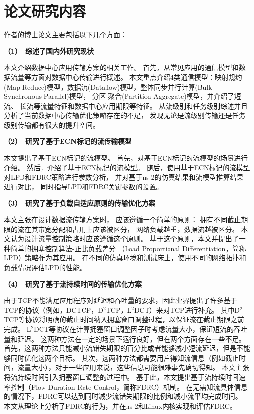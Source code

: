 \section{论文研究内容}
作者的博士论文主要包括以下几个方面：

\textbf{（1）~综述了国内外研究现状}

本文介绍数据中心应用传输方案的相关工作。
首先，从常见应用的通信模型和数据流量等方面对数据中心传输进行概述。
本文重点介绍4类通信模型：映射规约(Map-Reduce)模型，数据流(Dataflow)模型，整体同步并行计算(Bulk Synchronous Parallel)模型，
分区-聚合(Partition-Aggregate)模型，并介绍了短流、
长流等流量特征和数据中心应用期限等特征。
从流级别和任务级别综述并且分析了当前数据中心传输优化策略存在的不足，
发现无论是流级别传输还是任务级别传输都有很大的提升空间。

\textbf{（2）~研究了基于ECN标记的流传输模型}

本文提出了基于ECN标记的流模型。
首先，对基于ECN标记的流模型的场景进行介绍。
然后，介绍了基于ECN标记的流模型。
随后，使用基于ECN标记的流模型对LPD和FDRC策略进行参数分析，
并对基于ns-2的仿真结果和流模型推算结果进行对比，
同时指导LPD和FDRC关键参数的设置。

\textbf{（3）~研究了基于负载自适应原则的传输优化方案 }

本文主张在设计数据流传输方案时，
应该遵循一个简单的原则：
拥有不同截止期限的流在其带宽分配和占用上应该被区分，
网络负载越重，数据流越被区分。
本文认为设计流量控制策略时应该遵循这个原则。
基于这个原则，本文并提出了一种简单的拥塞控制算法-正比负载差分
（Load Proportional Differentiation，简称LPD）策略作为其应用。
在不同的仿真环境和测试床上，使用不同的网络拓扑和负载情况评估LPD的性能。

\textbf{（4）~研究了基于流持续时间的传输优化方案}

由于TCP不能满足应用程序对延迟和吞吐量的要求，因此业界提出了许多基于TCP的协议（例如，DCTCP，D$^2$TCP，L$^2$DCT）来对TCP进行补充。
其中D$^2$TCP等协议将明确的截止时间纳入拥塞窗口调整过程，以保证流在截止期限之前完成。
L$^2$DCT等协议在计算拥塞窗口调整因子时考虑流量大小，保证短流的吞吐量和延迟。
这两种方法在一定的场景下运行良好，但在两个方面存在一些不足。
首先，这两种方法只能减小流错失期限的百分比或者能够减小短流延迟，但是不能够同时优化这两个目标。
其次，这两种方法都需要用户得知流信息（例如截止时间，流量大小），对于一些应用来说，这些信息可能很难事先确切得知。
本文主张将流持续时间引入拥塞窗口调整的过程中。
基于此，本文提出基于流持续时间速率控制（Flow Duration Rate Control，简称FDRC）机制。
在无需知流具体信息的情况下，FDRC可以达到同时减少流错失期限的比例和减小流平均完成时间。
本文从理论上分析了FDRC的行为，并在ns-2和Linux内核实现和评估FDRC。

